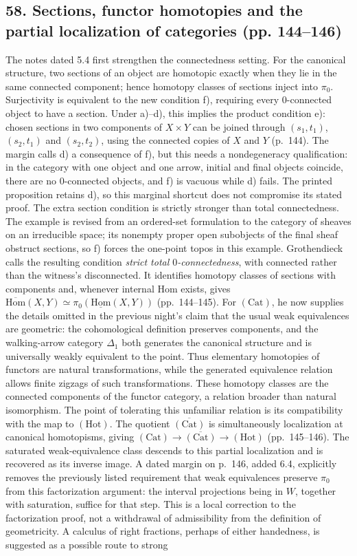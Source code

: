 \documentclass[10pt,oneside]{book}
\begin{document}
\subsection*{58. Sections, functor homotopies and the partial localization of categories (pp. 144--146)}
The notes dated 5.4 first strengthen the connectedness setting. For the canonical structure, two sections of an object are homotopic exactly when they lie in the same connected component; hence homotopy classes of sections inject into $\pi_0$. Surjectivity is equivalent to the new condition f), requiring every $0$-connected object to have a section. Under a)--d), this implies the product condition e): chosen sections in two components of $X\times Y$ can be joined through $(s_1,t_1)$, $(s_2,t_1)$ and $(s_2,t_2)$, using the connected copies of $X$ and $Y$ (p.~144). The margin calls d) a consequence of f), but this needs a nondegeneracy qualification: in the category with one object and one arrow, initial and final objects coincide, there are no $0$-connected objects, and f) is vacuous while d) fails. The printed proposition retains d), so this marginal shortcut does not compromise its stated proof. The extra section condition is strictly stronger than total connectedness. The example is revised from an ordered-set formulation to the category of sheaves on an irreducible space; its nonempty proper open subobjects of the final sheaf obstruct sections, so f) forces the one-point topos in this example. Grothendieck calls the resulting condition \emph{strict total $0$-connectedness}, with connected rather than the witness's disconnected. It identifies homotopy classes of sections with components and, whenever internal Hom exists, gives $\overline{\mathrm{Hom}}(X,Y)\simeq\pi_0(\underline{\mathrm{Hom}}(X,Y))$ (pp.~144--145). For $(\mathrm{Cat})$, he now supplies the details omitted in the previous night's claim that the usual weak equivalences are geometric: the cohomological definition preserves components, and the walking-arrow category $\Delta_1$ both generates the canonical structure and is universally weakly equivalent to the point. Thus elementary homotopies of functors are natural transformations, while the generated equivalence relation allows finite zigzags of such transformations. These homotopy classes are the connected components of the functor category, a relation broader than natural isomorphism. The point of tolerating this unfamiliar relation is its compatibility with the map to $(\mathrm{Hot})$. The quotient $\overline{(\mathrm{Cat})}$ is simultaneously localization at canonical homotopisms, giving $(\mathrm{Cat})\to\overline{(\mathrm{Cat})}\to(\mathrm{Hot})$ (pp.~145--146). The saturated weak-equivalence class descends to this partial localization and is recovered as its inverse image. A dated margin on p.~146, added 6.4, explicitly removes the previously listed requirement that weak equivalences preserve $\pi_0$ from this factorization argument: the interval projections being in $W$, together with saturation, suffice for that step. This is a local correction to the factorization proof, not a withdrawal of admissibility from the definition of geometricity. A calculus of right fractions, perhaps of either handedness, is suggested as a possible route to strong 
\end{document}
